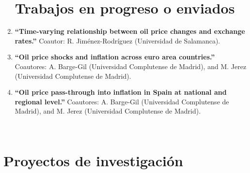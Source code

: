 \documentclass[11pt]{article}\usepackage[]{graphicx}\usepackage[]{color}
\begin{document}
\begin{enumerate}
\noindent
\vspace{10pt}
\section{Trabajos en progreso o enviados}

\item \textbf{``Time-varying relationship between oil price changes and exchange rates.''} Coautor: R. Jiménez-Rodríguez (Universidad de Salamanca).

\item \textbf{``Oil price shocks and inflation across euro area countries.''} Coautores: A. Barge-Gil (Universidad Complutense de Madrid), and M. Jerez (Universidad Complutense de Madrid).

\item \textbf{``Oil price pass-through into inflation in Spain at national and regional level.''} Coautores: A. Barge-Gil (Universidad Complutense de Madrid), and M. Jerez (Universidad Complutense de Madrid).

\\
\end{enumerate}

\section{Proyectos de investigación} 
\end{document}
